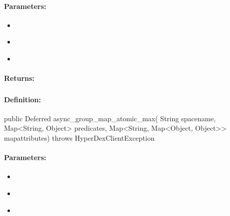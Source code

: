 \paragraph{Parameters:}
\begin{itemize}[noitemsep]
\item {}\\

\item {}\\

\item {}\\

\end{itemize}

\paragraph{Returns:}


\pagebreak
\subsubsection{}
\label{api:java:async_group_map_atomic_max}


\paragraph{Definition:}
\begin{javacode}
public Deferred async_group_map_atomic_max(
        String spacename,
        Map<String, Object> predicates,
        Map<String, Map<Object, Object>> mapattributes) throws HyperDexClientException
\end{javacode}

\paragraph{Parameters:}
\begin{itemize}[noitemsep]
\item {}\\

\item {}\\

\item {}\\

\end{itemize}


